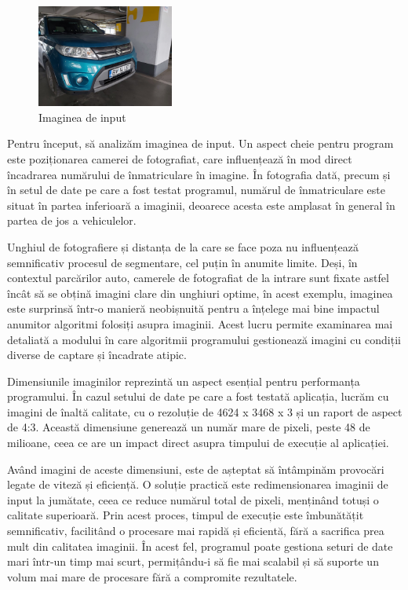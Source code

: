 \documentclass[a4paper,12pt]{report}
\begin{document}
\begin{figure}[h]
    \centering
    \includegraphics[width=0.4\textwidth]{images/input.jpg}
    \caption{Imaginea de input}
\end{figure}
\FloatBarrier

Pentru început, să analizăm imaginea de input. Un aspect cheie pentru program este poziționarea camerei de fotografiat, care influențează în mod direct încadrarea numărului de înmatriculare în imagine. În fotografia dată, precum și în setul de date pe care a fost testat programul, numărul de înmatriculare este situat în partea inferioară a imaginii, deoarece acesta este amplasat în general în partea de jos a vehiculelor.

Unghiul de fotografiere și distanța de la care se face poza nu influențează semnificativ procesul de segmentare, cel puțin în anumite limite. Deși, în contextul parcărilor auto, camerele de fotografiat de la intrare sunt fixate astfel încât să se obțină imagini clare din unghiuri optime, în acest exemplu, imaginea este surprinsă într-o manieră neobișnuită pentru a înțelege mai bine impactul anumitor algoritmi folosiți asupra imaginii. Acest lucru permite examinarea mai detaliată a modului în care algoritmii programului gestionează imagini cu condiții diverse de captare și încadrate atipic.

Dimensiunile imaginilor reprezintă un aspect esențial pentru performanța programului. În cazul setului de date pe care a fost testată aplicația, lucrăm cu imagini de înaltă calitate, cu o rezoluție de 4624 x 3468 x 3 și un raport de aspect de 4:3. Această dimensiune generează un număr mare de pixeli, peste 48 de milioane, ceea ce are un impact direct asupra timpului de execuție al aplicației.

Având imagini de aceste dimensiuni, este de așteptat să întâmpinăm provocări legate de viteză și eficiență. O soluție practică este redimensionarea imaginii de input la jumătate, ceea ce reduce numărul total de pixeli, menținând totuși o calitate superioară. Prin acest proces, timpul de execuție este îmbunătățit semnificativ, facilitând o procesare mai rapidă și eficientă, fără a sacrifica prea mult din calitatea imaginii. În acest fel, programul poate gestiona seturi de date mari într-un timp mai scurt, permițându-i să fie mai scalabil și să suporte un volum mai mare de procesare fără a compromite rezultatele.
\end{document}
